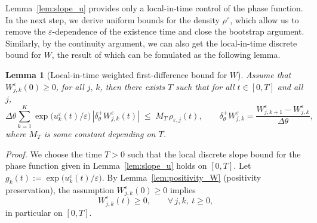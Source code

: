 \documentclass[11pt, dina4, amsfont12]{article}
\newtheorem{lemma}{Lemma}[section]
\begin{document}
\medskip

Lemma~\ref{lem:slope_u} provides only a local-in-time control of the phase
function. In the next step, we derive uniform bounds for the density
$\rho^\varepsilon$, which allow us to remove the $\varepsilon$-dependence of the
existence time and close the bootstrap argument.
Similarly, by the continuity argument, we can also get the local-in-time discrete bound for $W$, the result of which can be fomulated as the following lemma. 

\begin{lemma}[Local-in-time weighted first-difference bound for $W$]\label{lem:W_diff}
Assume that $W_{j,k}^\varepsilon(0)\ge0$, for all $j,\, k$, 
then there exists $T$ such that for all $t\in[0,T]$ and all $j$,
\begin{equation}\label{eq:weighted_first_diff_W_simple}
\Delta\theta\sum_{k=1}^K
\exp\!\big(u_k^\varepsilon(t)/\varepsilon\big)\,|\delta_\theta^+ W_{j,k}^\varepsilon(t)|
\;\le\;
M_T\,\rho_{\varepsilon,j}(t),
\qquad
\delta_\theta^+W_{j,k}^\varepsilon=\frac{W_{j,k+1}^\varepsilon-W_{j,k}^\varepsilon}{\Delta\theta},
\end{equation}
where $M_T$ is some constant depending on $T$.
\end{lemma}

\textit{Proof.}
We choose the time $T>0$ such that the local discrete slope bound for the phase
function given in Lemma~\ref{lem:slope_u} holds on $[0,T]$.
Let $g_k(t):=\exp\!\big(u_k^\varepsilon(t)/\varepsilon\big)$.
By Lemma~\ref{lem:positivity_W} (positivity preservation), the assumption
$W_{j,k}^\varepsilon(0)\ge0$ implies
\[
W_{j,k}^\varepsilon(t)\ge0,
\qquad \forall\, j,k,\ t\ge0,
\]
in particular on $[0,T]$.
\end{document}
